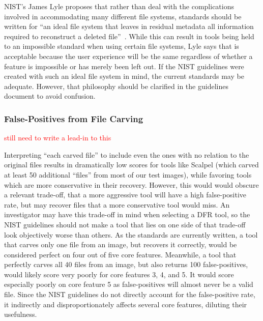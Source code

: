 \documentclass{ws-rv9x6}
\newcommand{\TODO}[1]{\textcolor{red}{#1}} %
\newenvironment{paraphrase}{\color{blue}}{\color{black}} %
\begin{document}
\begin{paraphrase}
NIST's James Lyle proposes that rather than deal with the complications involved in accommodating 
many different file systems, standards should be written for ``an ideal file system that leaves in 
residual metadata  all  information  required  to  reconstruct  a  deleted  file''~\cite{lyle2011-ICDF2C}. 
While this can result in tools being held to an impossible standard when using certain file systems, 
Lyle says that is acceptable because the user experience will be the same regardless of whether a feature is impossible or has merely been left out.
If the NIST guidelines were created with such an ideal file system in mind, the current standards may be adequate.
However, that philosophy should be clarified in the guidelines document to avoid confusion.
\end{paraphrase}



\subsubsection{False-Positives from File Carving}
\TODO{still need to write a lead-in to this}

 
Interpreting ``each carved file'' to include even the ones with no relation to the original files results in dramatically low scores for tools like Scalpel (which carved at least 50 additional ``files'' from most of our test images), while favoring tools which are more conservative in their recovery.
However, this would would obscure a relevant trade-off, that a more aggressive tool will have a high false-positive rate, but may recover files that a more conservative tool would miss.
An investigator may have this trade-off in mind when selecting a DFR tool, so the NIST guidelines should not make a tool that lies on one side of that trade-off look objectively worse than others.
As the standards are currently written, a tool that carves only one file from an image, but recovers it correctly, would be considered perfect on four out of five core features.
Meanwhile, a tool that perfectly carves all 40 files from an image, but also returns 100 false-positives, would likely score very poorly for core features 3, 4, and 5.
It would score especially poorly on core feature 5 as false-positives will almost never be a valid file.
Since the NIST guidelines do not directly account for the false-positive rate, it indirectly and disproportionately affects several core features, diluting their usefulness.
\end{document}
